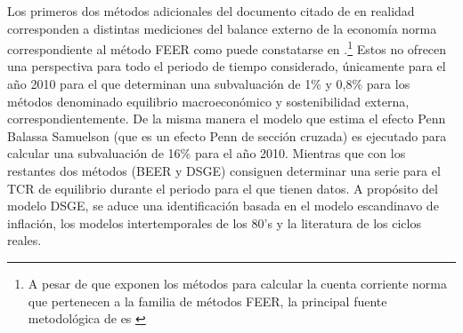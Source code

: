 \documentclass[12pt,letterpaper]{article}
\begin{document}
Los primeros dos métodos adicionales del documento citado de \cite{cerezo2011tipo} en realidad corresponden a distintas mediciones del balance externo de la economía norma correspondiente al método FEER como puede constatarse en \cite{bussiere2010methodological}.\footnote{A pesar de que \cite{bussiere2010methodological} exponen los métodos para calcular la cuenta corriente norma que pertenecen a la familia de métodos FEER, la principal fuente metodológica de \cite{cerezo2011tipo} es \cite{isard2007equilibrium}} Estos no ofrecen una perspectiva para todo el periodo de tiempo considerado, únicamente para el año 2010 para el que determinan una subvaluación de 1\% y 0,8\% para los métodos denominado equilibrio macroeconómico y sostenibilidad externa, correspondientemente. De la misma manera el modelo que estima el efecto Penn Balassa Samuelson (que es un efecto Penn de sección cruzada) es ejecutado para calcular una subvaluación de 16\% para el año 2010. Mientras que con los restantes dos métodos (BEER y DSGE) consiguen determinar una serie para el TCR de equilibrio durante el periodo para el que tienen datos. A propósito del modelo DSGE, se aduce una identificación basada en el modelo escandinavo de inflación, los modelos intertemporales de los 80's y la literatura de los ciclos reales.
\end{document}
